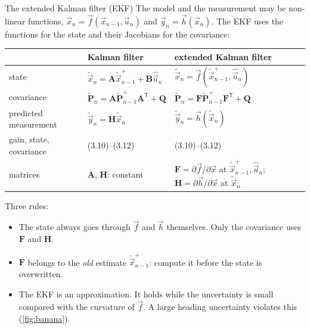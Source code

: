 \documentclass[11pt,a4paper,parskip=half]{scrartcl}
\newcommand{\mat}[1]{\mathbf{#1}}
\newcommand{\T}{^{\mathsf{T}}}
\begin{document}
\begin{theory}{The extended Kalman filter (EKF)}
The model and the measurement may be non-linear functions,
\(\vec x_n = \vec f(\vec x_{n-1}, \vec u_n)\) and \(\vec y_n = \vec h(\vec x_n)\). The EKF uses the functions for the
state and their Jacobians for the covariance:
\begin{center}
\renewcommand{\arraystretch}{1.5}
\begin{tabularx}{\linewidth}{@{}l l X@{}}
\toprule
& Kalman filter & extended Kalman filter \\
\midrule
state & \(\tilde{\vec x}_n = \mat A \tilde{\vec x}^+_{n-1} + \mat B \hat{\vec u}_n\)
      & \(\tilde{\vec x}_n = \vec f(\tilde{\vec x}^+_{n-1}, \hat{\vec u}_n)\) \\
covariance & \(\tilde{\mat P}_n = \mat A \tilde{\mat P}^+_{n-1} \mat A\T + \mat Q\)
           & \(\tilde{\mat P}_n = \mat F \tilde{\mat P}^+_{n-1} \mat F\T + \mat Q\) \\
predicted measurement & \(\tilde{\vec y}_n = \mat H \tilde{\vec x}_n\) & \(\tilde{\vec y}_n = \vec h(\tilde{\vec x}_n)\) \\
gain, state, covariance & (3.10)--(3.12) & (3.10)--(3.12) \\
matrices & \(\mat A\), \(\mat H\): constant
         & \(\mat F = \partial \vec f / \partial \vec x\) at \(\tilde{\vec x}^+_{n-1}, \hat{\vec u}_n\);
           \(\mat H = \partial \vec h / \partial \vec x\) at \(\tilde{\vec x}_n\) \\
\bottomrule
\end{tabularx}
\end{center}
Three rules:
\begin{itemize}
  \item The state always goes through \(\vec f\) and \(\vec h\) themselves. Only the covariance uses \(\mat F\) and
        \(\mat H\).
  \item \(\mat F\) belongs to the \emph{old} estimate \(\tilde{\vec x}^+_{n-1}\): compute it before the state is
        overwritten.
  \item The EKF is an approximation. It holds while the uncertainty is small compared with the curvature of
        \(\vec f\). A large heading uncertainty violates this (\cref{fig:banana}).
\end{itemize}
\end{theory}
\end{document}

